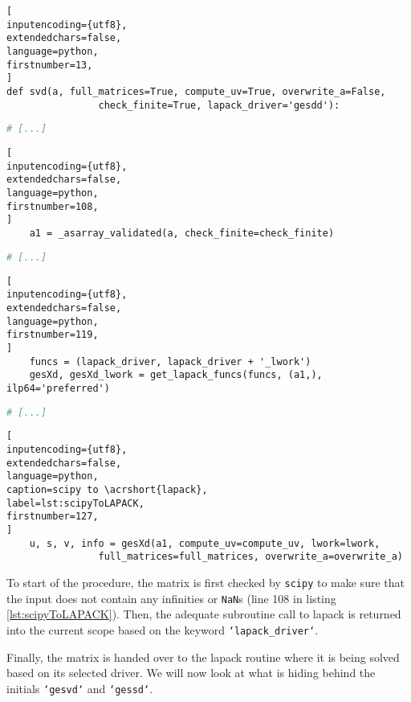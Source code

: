 \begin{lstlisting}[
inputencoding={utf8}, 
extendedchars=false, 
language=python,
firstnumber=13,
]
def svd(a, full_matrices=True, compute_uv=True, overwrite_a=False,
        		check_finite=True, lapack_driver='gesdd'):
\end{lstlisting}
%
%
%
\spacingConcatLists
\begin{lstlisting}[language=python, numbers=none]
    # [...]
\end{lstlisting}
%
%
%
\spacingConcatLists
\begin{lstlisting}[
inputencoding={utf8}, 
extendedchars=false, 
language=python,
firstnumber=108,
]
    a1 = _asarray_validated(a, check_finite=check_finite)
\end{lstlisting}
%
%
%
\spacingConcatLists
\begin{lstlisting}[language=python, numbers=none]
    # [...]
\end{lstlisting}
%
%
%
\spacingConcatLists
\begin{lstlisting}[
inputencoding={utf8}, 
extendedchars=false, 
language=python,
firstnumber=119,
]
    funcs = (lapack_driver, lapack_driver + '_lwork')
    gesXd, gesXd_lwork = get_lapack_funcs(funcs, (a1,), ilp64='preferred')
\end{lstlisting}
%
%
%
\spacingConcatLists
\begin{lstlisting}[language=python, numbers=none]
    # [...]
\end{lstlisting}
%
%
%
\spacingConcatLists
\begin{lstlisting}[
inputencoding={utf8}, 
extendedchars=false, 
language=python, 
caption=scipy to \acrshort{lapack}, 
label=lst:scipyToLAPACK,
firstnumber=127,
]
    u, s, v, info = gesXd(a1, compute_uv=compute_uv, lwork=lwork,
                full_matrices=full_matrices, overwrite_a=overwrite_a)
\end{lstlisting}



\noindent
To start of the procedure, the matrix is first checked by \texttt{scipy} to make sure that the input does not contain any infinities or \texttt{NaN}s (line 108 in listing \ref{lst:scipyToLAPACK}).
Then, the adequate subroutine call to \acrshort{lapack} is returned into the current scope based on the keyword \texttt{`lapack\_driver`}.

Finally, the matrix is handed over to the \acrshort{lapack} routine where it is being solved based on its selected driver.
We will now look at what is hiding behind the initials \texttt{`gesvd`} and \texttt{`gessd`}.
\bigskip

